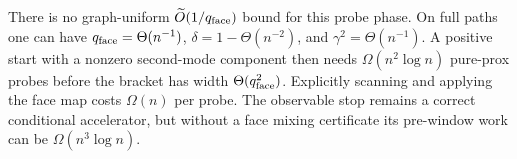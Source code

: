 There is no graph-uniform $\widetilde O(1/q_{\rm face})$ bound for this probe
phase.  On full paths one can have
$q_{\rm face}=\Theta(n^{-1})$,
$\delta=1-\Theta(n^{-2})$, and $\gamma^2=\Theta(n^{-1})$.
A positive start with a nonzero second-mode component then needs
$\Omega(n^2\log n)$ pure-prox probes before the bracket has width
$\Theta(q_{\rm face}^2)$.  Explicitly scanning and applying the face map
costs $\Omega(n)$ per probe.  The observable stop remains a correct
conditional accelerator, but without a face mixing certificate its
pre-window work can be $\Omega(n^3\log n)$.
